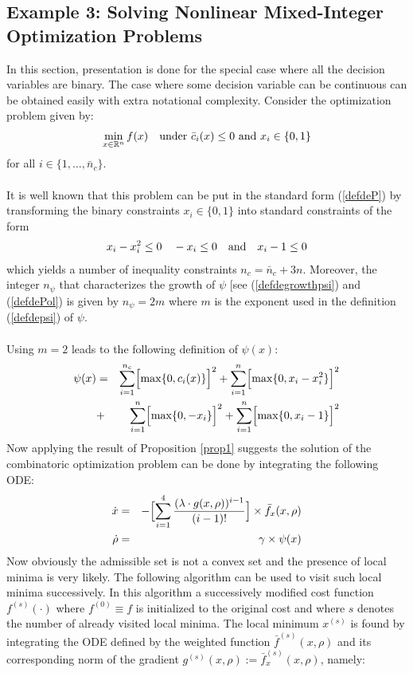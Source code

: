 \documentclass{article}
\begin{document}
\subsection{Example 3: Solving Nonlinear Mixed-Integer Optimization Problems}
\noindent In this section, presentation is done for the special case where all the decision variables are binary. The case where some decision variable can be continuous can be obtained easily with extra notational complexity. Consider the optimization problem given by:
\begin{eqnarray}
\min_{x\in \mathbb{R}^n} f(x)\quad \mbox{\rm under $\bar c_i(x)\le 0$ and $x_i\in \{0,1\}$} 
\end{eqnarray} 
for all $i\in \{1,\dots,\bar n_c\}$. \ \\ \ \\ 
It is well known that this problem can be put in the standard form (\ref{defdeP}) by transforming the binary  constraints $x_i\in \{0,1\}$ into standard constraints of the form
\begin{eqnarray}
x_i-x_i^2\le 0\quad -x_i\le 0\quad \mbox{\rm and}\quad x_i-1\le 0 
\end{eqnarray}  
which yields a number of inequality constraints $n_c=\bar n_c+3n$. Moreover, the integer $n_\psi$ that characterizes the growth of $\psi$ [see (\ref{defdegrowthpsi}) and (\ref{defdePol}) is given by $n_\psi=2m$ where $m$ is the exponent used in the definition (\ref{defdepsi}) of $\psi$.\ \\ \ \\ 
Using $m=2$ leads to the following definition of $\psi(x)$:
\begin{eqnarray*}
\psi(x)&=&\sum_{i=1}^{n_c}\Bigl[\max\{0,c_i(x)\}\Bigr]^2+\sum_{i=1}^{n}\Bigl[\max\{0,x_i-x_i^2\}\Bigr]^2\\
&+&\sum_{i=1}^{n}\Bigl[\max\{0,-x_i\}\Bigr]^2+\sum_{i=1}^{n}\Bigl[\max\{0,x_i-1\}\Bigr]^2
\end{eqnarray*}  
Now applying the result of Proposition \ref{prop1} suggests the solution of the combinatoric optimization problem can be done by integrating the following ODE:
\begin{eqnarray}
\dot x&=&-\Bigl[\sum_{i=1}^{4}\dfrac{(\lambda\cdot g(x,\rho))^{i-1}}{(i-1)!}\Bigr]\times \bar f_x(x,\rho) \label{odej1}\\
\dot \rho &=& \gamma\times \psi(x) \label{odej2} 
\end{eqnarray}  
Now obviously the admissible set is not a convex set and the presence of local minima is very likely. The following algorithm can be used to visit such local minima successively. In this algorithm a successively modified cost function $f^{(s)}(\cdot)$ where $f^{(0)}\equiv f$ is initialized to the original cost and where $s$ denotes the number of already visited local minima. The local minimum $x^{(s)}$ is found by integrating the ODE defined by the weighted function $\bar f^{(s)}(x,\rho)$ and its corresponding norm of the gradient $g^{(s)}(x,\rho):=\bar f_x^{(s)}(x,\rho)$, namely:
\end{document}
